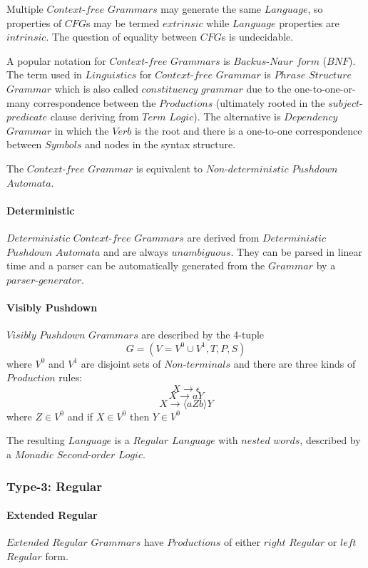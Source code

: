 \documentclass{article}
\begin{document}
Multiple $Context$-$free$ $Grammars$ may generate the same $Language$,
so properties of $CFG$s may be termed $extrinsic$ while $Language$
properties are $intrinsic$. The question of equality between $CFG$s is
undecidable.

A popular notation for $Context$-$free$ $Grammars$ is $Backus$-$Naur$
$form$ ($BNF$). The term used in $Linguistics$ for $Context$-$free$
$Grammar$ is $Phrase$ $Structure$ $Grammar$ which is also called
$constituency$ $grammar$ due to the one-to-one-or-many correspondence
between the $Productions$ (ultimately rooted in the
$subject$-$predicate$ clause deriving from $Term$ $Logic$). The
alternative is $Dependency$ $Grammar$ in which the $Verb$ is the root
and there is a one-to-one correspondence between $Symbols$ and nodes
in the syntax structure.

The $Context$-$free$ $Grammar$ is equivalent to $Non$-$deterministic$
$Pushdown$ $Automata$.

\paragraph{Deterministic}
$Deterministic$ $Context$-$free$ $Grammars$ are derived from
$Deterministic$ $Pushdown$ $Automata$ and are always
$unambiguous$. They can be parsed in linear time and a parser can be
automatically generated from the $Grammar$ by a $parser$-$generator$.

\paragraph{Visibly Pushdown}
$Visibly$ $Pushdown$ $Grammars$ are described by the 4-tuple
\[
    G = (V=V^0 \cup V^1,T,P,S)
\]
where $V^0$ and $V^1$ are disjoint sets of $Non$-$terminals$ and there
are three kinds of $Production$ rules:
\[
    X \rightarrow \epsilon
\]\[
    X \rightarrow aY
\]\[
    X \rightarrow \langle aZb \rangle Y
\]
where $Z \in V^0$ and if $X \in V^0$ then $Y \in V^0$

The resulting $Language$ is a $Regular$ $Language$ with $nested$
$words$, described by a $Monadic$ $Second$-$order$ $Logic$.

\subsubsection{Type-3: Regular}

\paragraph{Extended Regular}
$Extended$ $Regular$ $Grammars$ have $Productions$ of either $right$
$Regular$ or $left$ $Regular$ form.
\end{document}
